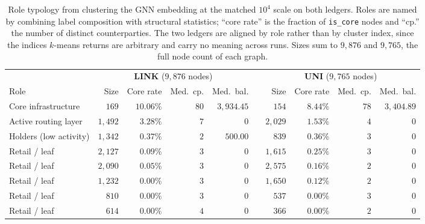 \documentclass[final,5p,times]{elsarticle}
\renewcommand{\arraystretch}{1.22}
\renewcommand{\arraystretch}{1.22}
\begin{document}
\begin{table}[t]
\centering\footnotesize
\caption{Role typology from clustering the GNN embedding at the matched
$10^4$ scale on both ledgers. Roles are named by combining label composition
with structural statistics; ``core rate'' is the fraction of
\texttt{is\_core} nodes and ``cp.'' the number of distinct counterparties.
The two ledgers are aligned by role rather than by cluster index, since the
indices $k$-means returns are arbitrary and carry no meaning across runs.
Sizes sum to $9{,}876$ and $9{,}765$, the full node count of each graph.}
\label{tab:typology}
\setlength{\tabcolsep}{4.5pt}
\renewcommand{\arraystretch}{1.0}
\begin{tabular}{@{}l rrrr c rrrr@{}}
\toprule
& \multicolumn{4}{c}{\textbf{LINK} ($9{,}876$ nodes)} & &
  \multicolumn{4}{c}{\textbf{UNI} ($9{,}765$ nodes)} \\
\cmidrule(r){2-5}\cmidrule(l){7-10}
Role & Size & Core rate & Med.\ cp. & Med.\ bal. & &
       Size & Core rate & Med.\ cp. & Med.\ bal. \\
\midrule
Core infrastructure    & $169$     & $10.06\%$ & $80$ & $3{,}934.45$ & &
                         $154$     & $8.44\%$  & $78$ & $3{,}404.89$ \\
Active routing layer   & $1{,}492$ & $3.28\%$  & $7$  & $0$          & &
                         $2{,}029$ & $1.53\%$  & $4$  & $0$          \\
Holders (low activity) & $1{,}342$ & $0.37\%$  & $2$  & $500.00$     & &
                         $839$     & $0.36\%$  & $3$  & $0$          \\
\addlinespace[2pt]
Retail / leaf          & $2{,}127$ & $0.09\%$  & $3$  & $0$          & &
                         $1{,}615$ & $0.25\%$  & $3$  & $0$          \\
Retail / leaf          & $2{,}090$ & $0.05\%$  & $3$  & $0$          & &
                         $2{,}575$ & $0.16\%$  & $2$  & $0$          \\
Retail / leaf          & $1{,}232$ & $0.00\%$  & $3$  & $0$          & &
                         $1{,}650$ & $0.12\%$  & $2$  & $0$          \\
Retail / leaf          & $810$     & $0.00\%$  & $3$  & $0$          & &
                         $537$     & $0.00\%$  & $3$  & $0$          \\
Retail / leaf          & $614$     & $0.00\%$  & $4$  & $0$          & &
                         $366$     & $0.00\%$  & $2$  & $0$          \\
\bottomrule
\end{tabular}
\end{table}
\end{document}
